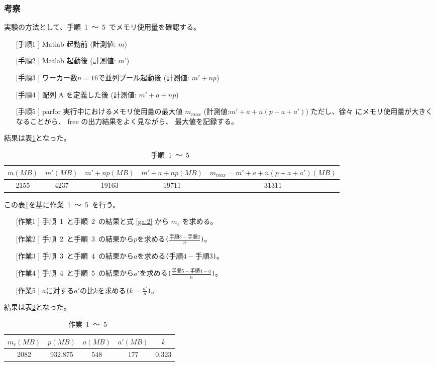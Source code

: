 \documentclass[10pt]{jarticle}
\begin{document}
\subsubsection{考察}
%
実験の方法として、手順\ 1\ ～\ 5\ でメモリ使用量を確認する。
\begin{itemize}[left=30pt]
	\item[[手順1]] Matlab 起動前 (計測値: $m$)
	\item[[手順2]] Matlab 起動後 (計測値: $m'$)
	\item[[手順3]] ワーカー数$n=16$で並列プール起動後 (計測値: $m' + np$)
	\item[[手順4]] 配列 A を定義した後 (計測値: $m' + a + np$)
	\item[[手順5]] parfor 実行中におけるメモリ使用量の最大値 $m_{max}$ (計測値:$m' + a + n(p + a + a')$) ただし、徐々
	にメモリ使用量が大きくなることから、 free の出力結果をよく見ながら、 最大値を記録する。
\end{itemize}
結果は表\ref{table:11t}となった。
\begin{table}[htbp]
	\centering
	\caption{手順\ 1\ ～\ 5\ }
	\label{table:11t}
	\begin{tabular}{|c|c|c|c|c|}
		\hline
		$m(MB)$ &$ m'(MB) $& $m' + np(MB)$ & $m' + a + np(MB)$ & $m_{max}=m'+a+n(p+a+a')(MB)$ \\
		\hline
		2155 & 4237 & 19163 & 19711 & 31311 \\
		\hline
	\end{tabular}
\end{table}
この表\ref{table:11t}を基に作業\ 1\ ～\ 5\ を行う。
\begin{itemize}[left=30pt]
\item[[作業1]] 手順\ 1\ と手順\ 2\ の結果と式 \ref{ga:2} から $m_{c}$ を求める。
\item[[作業2]] 手順\ 2\ と手順\ 3\ の結果から$ p $を求める\verb|(|$\frac{手順 3 - 手順 2}{n}$\verb|)|。
\item[[作業3]] 手順\ 3\ と手順\ 4\ の結果から$ a $を求める\verb|(|$手順 4 - 手順 3$\verb|)|。
\item[[作業4]] 手順\ 4\ と手順\ 5\ の結果から$ a' $を求める\verb|(|$\frac{手順 5 - 手順 4 - a}{n}$\verb|)|。
\item[[作業5]] $ a $に対する$ a' $の比$ k $を求める\verb|(|$k=\frac{a'}{a}$\verb|)|。
\end{itemize}
結果は表\ref{table:11s}となった。
\begin{table}[htbp]
	\centering
	\caption{作業\ 1\ ～\ 5\ }
	\label{table:11s}
	\begin{tabular}{|c|c|c|c|c|}
		\hline
		$m_{c}(MB)$ & $p(MB)$ & $a(MB)$ & $a'(MB)$ & $k$ \\
		\hline
		2082 &  932.875 & 548 & 177 & 0.323 \\
		\hline
	\end{tabular}
\end{table}
\end{document}
